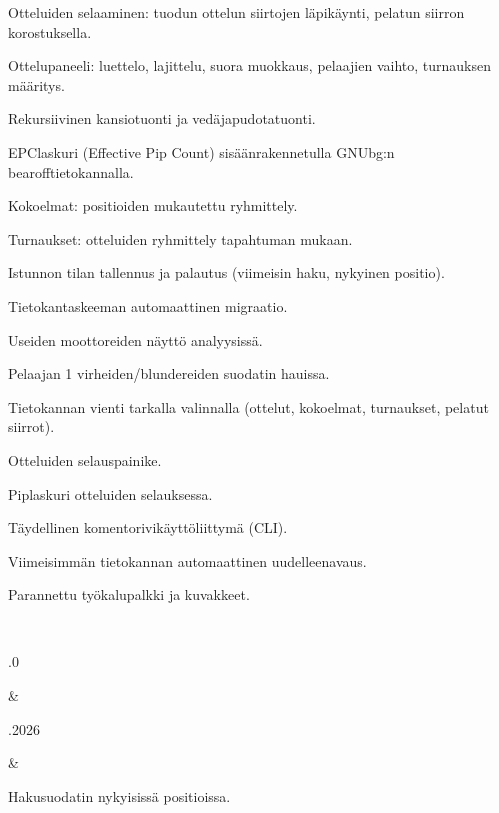 \documentclass[letterpaper,10pt,finnish]{sphinxmanual}
\begin{document}
\begin{savenotes}
\begin{longtable}{}
\begin{varwidth}[t]{}
\sphinxAtStartPar
Otteluiden selaaminen: tuodun ottelun siirtojen läpikäynti, pelatun siirron korostuksella.

\sphinxAtStartPar
Ottelupaneeli: luettelo, lajittelu, suora muokkaus, pelaajien vaihto, turnauksen määritys.

\sphinxAtStartPar
Rekursiivinen kansiotuonti ja vedä\sphinxhyphen{}ja\sphinxhyphen{}pudota\sphinxhyphen{}tuonti.

\sphinxAtStartPar
EPC\sphinxhyphen{}laskuri (Effective Pip Count) sisäänrakennetulla GNUbg:n bearoff\sphinxhyphen{}tietokannalla.

\sphinxAtStartPar
Kokoelmat: positioiden mukautettu ryhmittely.

\sphinxAtStartPar
Turnaukset: otteluiden ryhmittely tapahtuman mukaan.

\sphinxAtStartPar
Istunnon tilan tallennus ja palautus (viimeisin haku, nykyinen positio).

\sphinxAtStartPar
Tietokantaskeeman automaattinen migraatio.

\sphinxAtStartPar
Useiden moottoreiden näyttö analyysissä.

\sphinxAtStartPar
Pelaajan 1 virheiden/blundereiden suodatin hauissa.

\sphinxAtStartPar
Tietokannan vienti tarkalla valinnalla (ottelut, kokoelmat, turnaukset, pelatut siirrot).

\sphinxAtStartPar
Otteluiden selauspainike.

\sphinxAtStartPar
Pip\sphinxhyphen{}laskuri otteluiden selauksessa.

\sphinxAtStartPar
Täydellinen komentorivikäyttöliittymä (CLI).

\sphinxAtStartPar
Viimeisimmän tietokannan automaattinen uudelleenavaus.

\sphinxAtStartPar
Parannettu työkalupalkki ja kuvakkeet.
\sphinxbeforeendvarwidth
\end{varwidth}%
\\
\sphinxhline\begin{varwidth}[t]{}
.0
\sphinxbeforeendvarwidth
\end{varwidth}%
&\begin{varwidth}[t]{}
.2026
\sphinxbeforeendvarwidth
\end{varwidth}%
&\begin{varwidth}[t]{}
\sphinxAtStartPar
Hakusuodatin nykyisissä positioissa.


\end{varwidth}
\end{longtable}
\end{savenotes}
\end{document}
